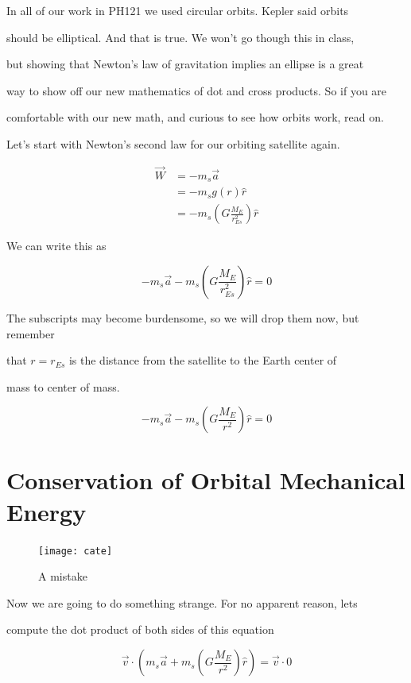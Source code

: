 In all of our work in PH121 we used circular orbits. Kepler said orbits

should be elliptical. And that is true. We won't go though this in class,

but showing that Newton's law of gravitation implies an ellipse is a great

way to show off our new mathematics of dot and cross products. So if you are

comfortable with our new math, and curious to see how orbits work, read on.


Let's start with Newton's second law for our orbiting satellite again.

\begin{align*}
\overrightarrow{W}&=-m_{s}\overrightarrow{a}\\
&=-m_{s}g\left( r\right) \hat{r}\\
&=-m_{s}\left( G\frac{M_{E}}{r_{Es}^{2}}\right) \hat{r}
\end{align*}




We can write this as 

$$
-m_{s}\overrightarrow{a}-m_{s}\left( G\frac{M_{E}}{r_{Es}^{2}}\right) \hat{r}=0
$$


The subscripts may become burdensome, so we will drop them now, but remember

that $r=r_{Es}$ is the distance from the satellite to the Earth center of

mass to center of mass. 

$$-m_{s}\overrightarrow{a}-m_{s}\left( G\frac{M_{E}}{r^{2}}\right) \hat{r}=0$$


\section{Conservation of Orbital Mechanical Energy}

\begin{figure}[h]
	\begin{center}
		\texttt{[image: cate]}	
		\caption{A mistake}
	\end{center}
\end{figure}

Now we are going to do something strange. For no apparent reason, lets

compute the dot product of both sides of this equation 

$$\overrightarrow{v}\cdot \left( m_{s}\overrightarrow{a}+m_{s}\left( G\frac{M_{E}}{r^{2}}\right) \hat{r}\right) =\overrightarrow{v}\cdot 0 $$

